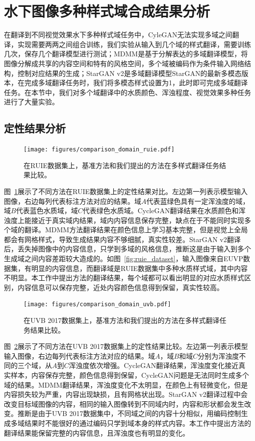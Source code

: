 \section{水下图像多种样式域合成结果分析}
在翻译到不同视觉效果水下多种样式域任务中，CyleGAN无法实现多域之间翻译，实现需要两两之间组合训练，我们实验从输入到几个域的样式翻译，需要训练几次，保存几个翻译模型进行测试；MDMM是基于分解表达的多域翻译模型，将图像分解成共享的内容空间和特有的风格空间，多个域被编码作为条件输入网络结构，控制对应结果的生成；StarGAN v2是多域翻译模型StarGAN的最新多模态版本，在完成多域翻译任务时，我们将多模态样式设置为1，此时即可完成多域翻译任务。在本节中，我们对多个域翻译中的水质颜色、浑浊程度、视觉效果多种任务进行了大量实验。

\subsection{定性结果分析}
\begin{figure}
    \centering
  \texttt{[image: figures/comparison\_domain\_ruie.pdf]}
  \caption{在RUIE数据集上，基准方法和我们提出的方法在多样式翻译任务结果比较。}
  \label{fig:comparison_domain_ruie}
\end{figure}

图~\ref{fig:comparison_domain_ruie}展示了不同方法在RUIE数据集上的定性结果对比。左边第一列表示模型输入图像，右边每列代表标注方法对应的结果。域$A$代表蓝绿色具有一定浑浊度的域，域$B$代表蓝色水质域，域$C$代表绿色水质域。CycleGAN翻译结果在水质颜色和浑浊度上能接近于真实域内结果，域内内容信息保存完整，缺点在于不能同时实现多个域的翻译。MDMM方法翻译结果在颜色信息上学习基本完整，但是视觉上全局都会有网格样式，导致生成结果内容不够细腻，真实性较差。StarGAN v2翻译后，丢失掉图像中的内容信息，只学到多域的风格信息，推断这是由于输入到多个生成域之间内容差距较大造成的。如图~\ref{fig:ruie_dataset}，输入图像来自EUVP数据集，有明显的内容信息，而翻译域是RUIE数据集中多种水质样式域，其中内容不明显。本工作中提出方法的翻译结果，每个域都可以看出明显的对应水质样式区别，内容信息可以保存完整，近处内容颜色信息得到保留，真实性较高。

\begin{figure}
    \centering
  \texttt{[image: figures/comparison\_domain\_uvb.pdf]}
  \caption{在UVB 2017数据集上，基准方法和我们提出的方法在多样式翻译任务结果比较。}
  \label{fig:comparison_domain_uvb}
\end{figure}

图~\ref{fig:comparison_domain_uvb}展示了不同方法在UVB 2017数据集上的定性结果比较。左边第一列表示模型输入图像，右边每列代表标注方法对应的结果。域$A$，域$B$和域$C$分别为浑浊度不同的三个域，从$A$到$C$浑浊度依次增强。CycleGAN翻译结果，浑浊度变化接近真实样本，内容保存完整，颜色信息得到保留，CycleGAN问题是无法同时生成多个域的结果。MDMM翻译结果，浑浊度变化不太明显，在颜色上有轻微变化，但是内容损失较为严重，内容出现缺损，且有网格状出现。StarGAN v2翻译过程中会改变目标域图像的内容，相同的输入图像转到不同域内时，内容和形状都会发生改变。推断是由于UVB 2017数据集中，不同域之间的内容十分相似，用编码控制生成多域结果时不能很好的通过编码只学到域本身的样式内容。本工作中提出方法的翻译结果能保留完整的内容信息，且浑浊度也有明显的变化。

